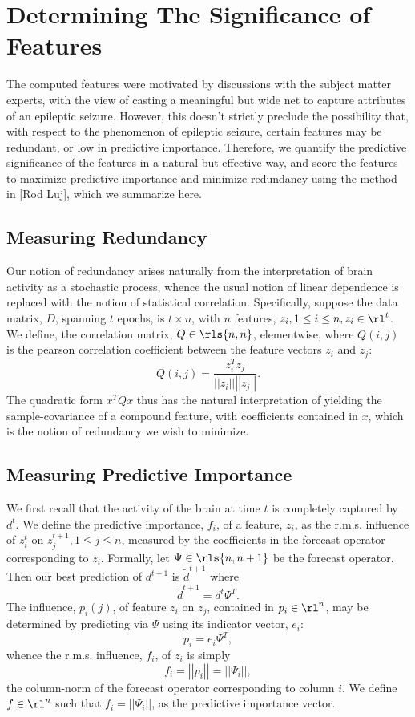 \documentclass{article} %
\newcommand{\norm}[1]{\left| \left| #1 \right| \right|}
\begin{document}
\section{Determining The Significance of Features}
The computed features were motivated by discussions with the subject matter experts, with the view of casting a meaningful but wide net to capture  attributes of an epileptic seizure. However, this doesn't strictly preclude the possibility that, with respect to the phenomenon of epileptic seizure, certain features may be redundant, or low in predictive importance. Therefore, we quantify the predictive significance of the features in a natural but effective way, and score the features to maximize predictive importance and minimize redundancy using the method in [Rod Luj], which we summarize here.

\subsection{Measuring Redundancy}
Our notion of redundancy arises naturally from the interpretation of brain activity as a stochastic process, whence the usual notion of linear dependence is replaced with the notion of statistical correlation. Specifically, suppose the data matrix, $D$, spanning $t$ epochs, is $t \times n$, with $n$ features, $z_i, 1 \leq i \leq n, z_i \in \rl^t$. We define, the correlation matrix, $Q \in \rls{n, n}$, elementwise, where $Q(i, j)$ is the pearson correlation coefficient between the feature vectors $z_i$ and $z_j$:
\[ Q(i, j) = \frac{z_i ^T z_j}{\norm{z_i}\norm{z_j}}.  \]
The quadratic form $x^T Q x$ thus has the natural interpretation of yielding the sample-covariance of a compound feature, with coefficients contained in $x$, which is the notion of redundancy we wish to minimize.

\subsection{Measuring Predictive Importance}
We first recall that the activity of the brain at time $t$ is completely captured by $d^t$. We define the predictive importance, $f_i$, of a feature, $z_i$, as the r.m.s. influence of $z_i ^t$ on $z_j ^{t+1}, 1 \leq j \leq n$, measured by the coefficients in the forecast operator corresponding to $z_i$. Formally, let $\Psi \in \rls{n, n+1}$ be the forecast operator. Then our best prediction of $d^{t+1}$ is $\tilde{d}^{t+1}$ where
\[ \tilde d^{t+1} = d^t \Psi ^T. \]
The influence, $p_i (j)$, of feature $z_i$ on $z_j$, contained in $p_i \in \rl^n$, may be determined by predicting via $\Psi$ using its indicator vector, $e_i$:
\[ p_i = e_i \Psi^T,  \]
whence the r.m.s. influence, $f_i$, of $z_i$ is simply 
\[ f_i = \norm{p_i} = \norm{\Psi_i}, \]
the column-norm of the forecast operator corresponding to column $i$. We define $f \in \rl^n$ such that $f_i = \norm{\Psi_i}$, as the predictive importance vector. 
\end{document}
